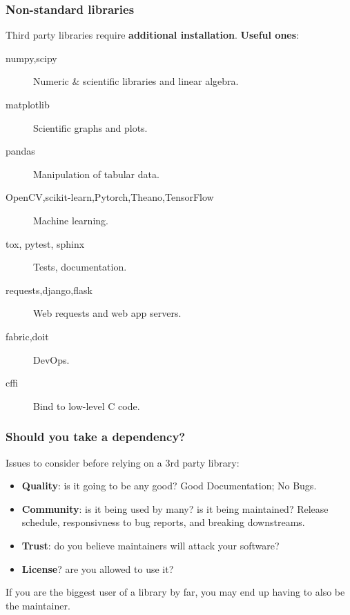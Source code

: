 \documentclass{beamer} %
\newcommand\emc[1]{\textcolor{midred}{\textbf{#1}}}
\begin{document}
\begin{frame}

\frametitle{Non-standard libraries}

Third party libraries require \emc{additional installation}. \emc{Useful ones}:

\begin{description}
  \item[numpy,scipy] Numeric \& scientific libraries and linear algebra.
  \item[matplotlib] Scientific graphs and plots.
  \item[pandas] Manipulation of tabular data.
  \item[OpenCV,scikit-learn,Pytorch,Theano,TensorFlow] Machine learning.
  \item[tox, pytest, sphinx] Tests, documentation.
  \item[requests,django,flask] Web requests and web app servers.
  \item[fabric,doit] DevOps.
  \item[cffi\hspace{0.5in}] \hspace{-0.5in}Bind to low-level C code.  %
\end{description}
\end{frame}


\begin{frame}

\frametitle{Should you take a dependency?}

Issues to consider before relying on a 3rd party library:
\begin{itemize}
\item \emc{Quality}: is it going to be any good? Good Documentation; No Bugs.
\item \emc{Community}: is it being used by many? is it being maintained? Release schedule, responsivness to bug reports, and breaking downstreams.
\item \emc{Trust}: do you believe maintainers will attack your software?
\item \emc{License}? are you allowed to use it?
\end{itemize}

\begin{block}{}
If you are the biggest user of a library by far, you may end up having to also be the maintainer.
\end{block}

\end{frame}
\end{document}
